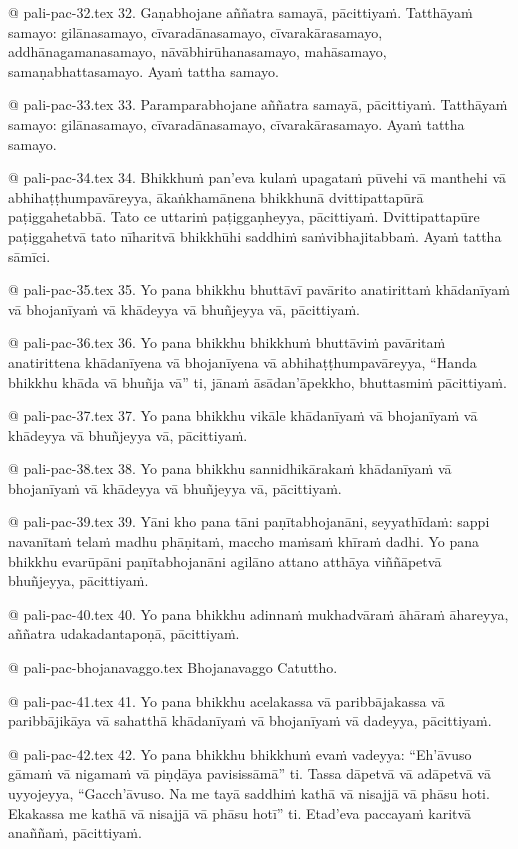 @ pali-pac-32.tex
32. Gaṇabhojane aññatra samayā, pācittiyaṁ. Tatthāyaṁ samayo: gilānasamayo, cīvaradānasamayo, cīvarakārasamayo, addhānagamanasamayo, nāvābhirūhanasamayo, mahāsamayo, samaṇabhattasamayo. Ayaṁ tattha samayo.

@ pali-pac-33.tex
33. Paramparabhojane aññatra samayā, pācittiyaṁ. Tatthāyaṁ samayo: gilānasamayo, cīvaradānasamayo, cīvarakārasamayo. Ayaṁ tattha samayo.

@ pali-pac-34.tex
34. Bhikkhuṁ pan’eva kulaṁ upagataṁ pūvehi vā manthehi vā abhihaṭṭhumpavāreyya, ākaṅkhamānena bhikkhunā dvittipattapūrā paṭiggahetabbā. Tato ce uttariṁ paṭiggaṇheyya, pācittiyaṁ. Dvittipattapūre paṭiggahetvā tato nīharitvā bhikkhūhi saddhiṁ saṁvibhajitabbaṁ. Ayaṁ tattha sāmīci.

@ pali-pac-35.tex
35. Yo pana bhikkhu bhuttāvī pavārito anatirittaṁ khādanīyaṁ vā bhojanīyaṁ vā khādeyya vā bhuñjeyya vā, pācittiyaṁ.

@ pali-pac-36.tex
36. Yo pana bhikkhu bhikkhuṁ bhuttāviṁ pavāritaṁ anatirittena khādanīyena vā bhojanīyena vā abhihaṭṭhumpavāreyya, “Handa bhikkhu khāda vā bhuñja vā” ti, jānaṁ āsādan’āpekkho, bhuttasmiṁ pācittiyaṁ.

@ pali-pac-37.tex
37. Yo pana bhikkhu vikāle khādanīyaṁ vā bhojanīyaṁ vā khādeyya vā bhuñjeyya vā, pācittiyaṁ.

@ pali-pac-38.tex
38. Yo pana bhikkhu sannidhikārakaṁ khādanīyaṁ vā bhojanīyaṁ vā khādeyya vā bhuñjeyya vā, pācittiyaṁ.

@ pali-pac-39.tex
39. Yāni kho pana tāni paṇītabhojanāni, seyyathīdaṁ: sappi navanītaṁ telaṁ madhu phāṇitaṁ, maccho maṁsaṁ khīraṁ dadhi. Yo pana bhikkhu evarūpāni paṇītabhojanāni agilāno attano atthāya viññāpetvā bhuñjeyya, pācittiyaṁ.

@ pali-pac-40.tex
40. Yo pana bhikkhu adinnaṁ mukhadvāraṁ āhāraṁ āhareyya,
aññatra udakadantapoṇā, pācittiyaṁ.

@ pali-pac-bhojanavaggo.tex
Bhojanavaggo Catuttho.

@ pali-pac-41.tex
41. Yo pana bhikkhu acelakassa vā paribbājakassa vā paribbājikāya vā sahatthā khādanīyaṁ vā bhojanīyaṁ vā dadeyya, pācittiyaṁ.

@ pali-pac-42.tex
42. Yo pana bhikkhu bhikkhuṁ evaṁ vadeyya: “Eh’āvuso gāmaṁ vā nigamaṁ vā piṇḍāya pavisissāmā” ti. Tassa dāpetvā vā adāpetvā vā uyyojeyya, “Gacch’āvuso. Na me tayā saddhiṁ kathā vā nisajjā vā phāsu hoti. Ekakassa me kathā vā nisajjā vā phāsu hotī” ti. Etad’eva paccayaṁ karitvā anaññaṁ, pācittiyaṁ.

